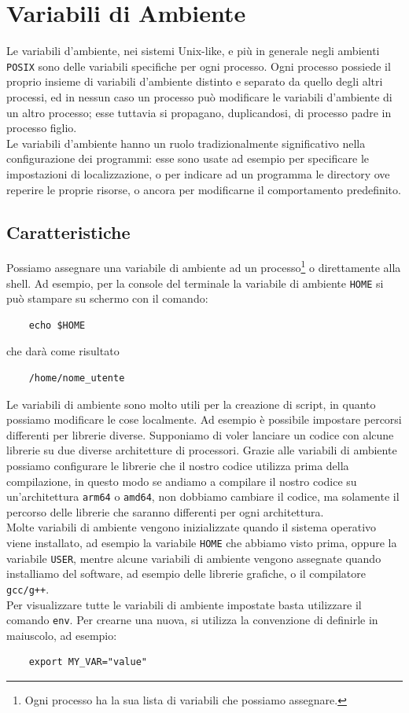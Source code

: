 \documentclass[11pt]{book}
\begin{document}
\chapter{Variabili di Ambiente}
Le variabili d'ambiente, nei sistemi Unix-like, e più in generale negli ambienti \verb*|POSIX| sono delle variabili specifiche per ogni processo. Ogni processo possiede il proprio insieme di variabili d'ambiente distinto e separato da quello degli altri processi, ed in nessun caso un processo può modificare le variabili d'ambiente di un altro processo; esse tuttavia si propagano, duplicandosi, di processo padre in processo figlio. \\
Le variabili d'ambiente hanno un ruolo tradizionalmente significativo nella configurazione dei programmi: esse sono usate ad esempio per specificare le impostazioni di localizzazione, o per indicare ad un programma le directory ove reperire le proprie risorse, o ancora per modificarne il comportamento predefinito. \\
\section{Caratteristiche}
Possiamo assegnare una variabile di ambiente ad un processo\footnote{Ogni processo ha la sua lista di variabili che possiamo assegnare.} o direttamente alla shell. Ad esempio, per la console del terminale la variabile di ambiente \verb*|HOME| si può stampare su schermo con il comando:
\begin{verbatim}
	echo $HOME
\end{verbatim}
che darà come risultato
\begin{verbatim}
	/home/nome_utente
\end{verbatim}

Le variabili di ambiente sono molto utili per la creazione di script, in quanto possiamo modificare le cose localmente. Ad esempio è possibile impostare percorsi differenti per librerie diverse. Supponiamo di voler lanciare un codice con alcune librerie su due diverse architetture di processori. Grazie alle variabili di ambiente possiamo configurare le librerie che il nostro codice utilizza prima della compilazione, in questo modo se andiamo a compilare il nostro codice su un'architettura \verb*|arm64| o \verb*|amd64|, non dobbiamo cambiare il codice, ma solamente il percorso delle librerie che saranno differenti per ogni architettura.\\

Molte variabili di ambiente vengono inizializzate quando il sistema operativo viene installato, ad esempio la variabile \verb*|HOME| che abbiamo visto prima, oppure la variabile \verb*|USER|, mentre alcune variabili di ambiente vengono assegnate quando installiamo del software, ad esempio delle librerie grafiche, o il compilatore \verb*|gcc/g++|.\\
Per visualizzare tutte le variabili di ambiente impostate basta utilizzare il comando \verb*|env|. Per crearne una nuova, si utilizza la convenzione di definirle in maiuscolo, ad esempio:
\begin{verbatim}
	export MY_VAR="value"
\end{verbatim}
\end{document}

